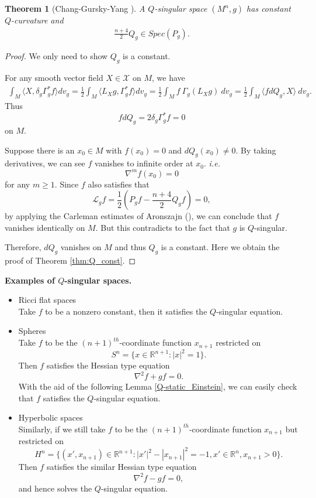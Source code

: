 \documentclass[12pt]{amsart}
\newtheorem{theorem}{Theorem}[section]
\theoremstyle{definition}
\theoremstyle{remark}
\numberwithin{equation}{section}
\begin{document}
\begin{theorem}[Chang-Gursky-Yang \cite{C-G-Y}]
A $Q$-singular space $(M^n, g)$ has constant $Q$-curvature and 
\begin{align}
\frac{n+4}{2}Q_g \in Spec(P_g).
\end{align}

\end{theorem}
\begin{proof}
We only need to show $Q_g$ is a constant.

For any smooth vector field $X \in \mathscr{X}$ on $M$, we have 
\begin{align*}
\int_M \langle X,   \delta_g \Gamma_g^* f \rangle dv_g = \frac{1}{2}\int_M \langle L_X g, \Gamma_g^* f \rangle dv_g = \frac{1}{2}\int_M f\ \Gamma_g (L_X g)\ dv_g  = \frac{1}{2}\int_M \langle f dQ_g, X \rangle \ dv_g.
\end{align*}
Thus $$fdQ_g = 2 \delta_g \Gamma_g^* f = 0$$ on $M$. 

Suppose there is an $x_0 \in M$ with $f(x_0) = 0$ and $dQ_g (x_0) \neq 0$. By taking derivatives, we can see $f$ vanishes to infinite order at $x_0$. \emph{i.e.} $$\nabla^m f(x_0) = 0$$ for any $m \geq 1$. Since $f$ also satisfies that $$\mathscr{L}_g f = \frac{1}{2} \left(P_g f -  \frac{n+4}{2}Q_g f\right) = 0,$$ by applying the Carleman estimates of Aronszajn (\cite{A}), we can conclude that $f$ vanishes identically on $M$. But this contradicts to the fact that $g$ is $Q$-singular. 

Therefore, $dQ_g$ vanishes on $M$ and thus $Q_g$ is a constant. Here we obtain the proof of Theorem \ref{thm:Q_const}.
\end{proof}

\textbf{Examples of $Q$-singular spaces.}

\begin{itemize}
  \item
  Ricci flat spaces\\
  Take $f$ to be a nonzero constant, then it satisfies the $Q$-singular equation.\\

  \item
  Spheres\\
  Take $f$ to be the $(n+1)^{th}$-coordinate function $x_{n+1}$ restricted on $$S^n = \{x\in \mathbb{R}^{n+1}: |x|^2 = 1\}.$$ Then $f$ satisfies the Hessian type equation $$\nabla^2 f + g f = 0.$$ With the aid of the following Lemma \ref{Q-static_Einstein}, we can easily check that $f$ satisfies the $Q$-singular equation.\\

  \item
  Hyperbolic spaces\\
  Similarly, if we still take $f$ to be the $(n+1)^{th}$-coordinate function $x_{n+1}$ but restricted on $$H^n = \{(x',x_{n+1})\in \mathbb{R}^{n+1}: |x'|^2 - |x_{n+1}|^2 = -1, x' \in \mathbb{R}^n, x_{n+1} > 0\}.$$ Then $f$ satisfies the similar Hessian type equation $$\nabla^2 f - g f = 0,$$ and hence solves the $Q$-singular equation.
\end{itemize}
\end{document}
